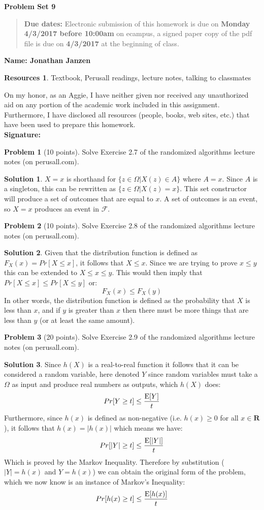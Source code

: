 \documentclass{article}
\theoremstyle{definition}
\newtheorem{problem}{Problem}
\newtheorem*{solution}{Solution}
\newtheorem*{resources}{Resources}
\newcommand{\name}[1]{\noindent\textbf{Name: #1}}
\newcommand{\honor}{\noindent On my honor, as an Aggie, I have neither
  given nor received any unauthorized aid on any portion of the
  academic work included in this assignment. Furthermore, I have
  disclosed all resources (people, books, web sites, etc.) that have
  been used to prepare this homework. \\[1ex]
 \textbf{Signature:} \underline{\hspace*{5cm}} }
\newcommand{\E}{\textup{E}}
\newcommand{\problemset}[1]{\begin{center}\textbf{Problem Set
      #1}\end{center}}
\newcommand{\duedate}[2]{\begin{quote}\textbf{Due dates:} Electronic
    submission of this homework is due on \textbf{#1} on ecampus, a
    signed paper copy of the pdf file is due on \textbf{#2} at the
    beginning of class. \end{quote} }
\newcommand{\R}{\mathbf{R}}
\begin{document}
\problemset{9}
\duedate{Monday 4/3/2017 before 10:00am}{4/3/2017}
\name{Jonathan Janzen}
\begin{resources} Textbook, Perusall readings, lecture notes, talking to classmates
\end{resources}
\honor

\begin{problem}[10 points] Solve Exercise 2.7 of the randomized
  algorithms lecture notes (on perusall.com). 
\end{problem}
\begin{solution}
$X = x$ is shorthand for $\{z \in \Omega | X(z) \in A\}$ where $A = {x}$. Since $A$ is a singleton, this can be rewritten as $\{z \in \Omega | X(z) = x\}$. This set constructor will produce a set of outcomes that are equal to $x$. A set of outcomes is an event, so $X = x$ produces an event in $\mathcal{F}$.
\end{solution}

\begin{problem}[10 points] Solve Exercise 2.8 of the randomized
  algorithms lecture notes (on perusall.com). 
\end{problem}
\begin{solution}
Given that the distribution function is defined as $F_X(x) = Pr[X \leq x]$, it follows that $X \leq x$. Since we are trying to prove $x \leq y$ this can be extended to $X \leq x \leq y$. This would then imply that $Pr[X \leq x] \leq Pr[X \leq y]$ or:
$$ F_X(x) \leq F_X(y) $$
In other words, the distribution function is defined as the probability that $X$ is less than $x$, and if $y$ is greater than $x$ then there must be more things that are less than $y$ (or at least the same amount).
\end{solution}

\begin{problem}[20 points] Solve Exercise 2.9 of the randomized
  algorithms lecture notes (on perusall.com). 
\end{problem}
\begin{solution}
Since $h(X)$ is a real-to-real function it follows that it can be considered a random variable, here denoted $Y$ since random variables must take a $\Omega$ as input and produce real numbers as outputs, which $h(X)$ does:
$$ Pr[Y \geq t] \leq \frac{\E[Y]}{t} $$
Furthermore, since $h(x)$ is defined as non-negative (i.e. $h(x) \geq 0$ for all $x \in \R$), it follows that $h(x) = |h(x)|$ which means we have:
$$ Pr[|Y| \geq t] \leq \frac{\E[|Y|]}{t} $$
Which is proved by the Markov Inequality. Therefore by substitution ($|Y| = h(x)$ and $Y = h(x)$) we can obtain the original form of the problem, which we now know is an instance of Markov's Inequality:
$$ Pr[h(x) \geq t] \leq \frac{\E[h(x)]}{t} $$
\end{solution}
\end{document}
